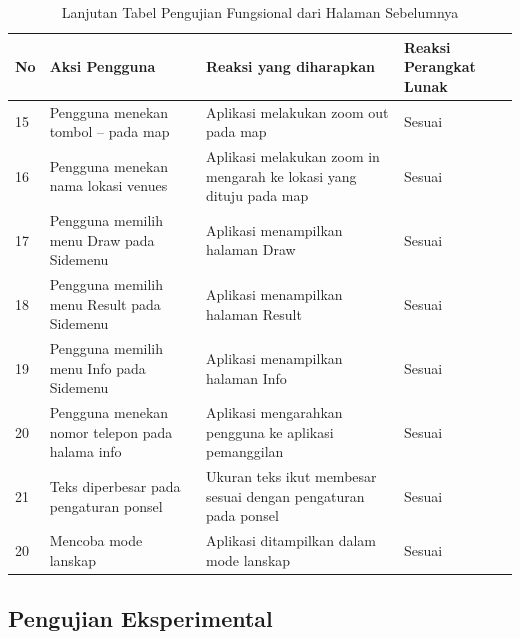 \begin{table}[H]
\caption{Lanjutan Tabel Pengujian Fungsional dari Halaman Sebelumnya}
\label{table:tabelPengujianFungsional}
\begin{tabular}{|p{0.3cm}|p{5.7cm}|p{5.7cm}|p{3cm}|}
\hline
No & Aksi Pengguna                                                                      & Reaksi yang diharapkan                                                               & Reaksi Perangkat Lunak \\ \hline
15 & Pengguna menekan tombol – pada map                                                 & Aplikasi melakukan zoom out pada map                                                 & Sesuai                 \\ \hline
16 & Pengguna menekan nama lokasi venues                                                & Aplikasi melakukan zoom in mengarah ke lokasi yang dituju pada map                   & Sesuai                 \\ \hline
17 & Pengguna memilih menu Draw pada Sidemenu                                            & Aplikasi menampilkan halaman Draw                                                    & Sesuai                 \\ \hline
18 & Pengguna memilih menu Result pada Sidemenu                                          & Aplikasi menampilkan halaman Result                                                  & Sesuai                 \\ \hline
19 & Pengguna memilih menu Info pada Sidemenu                                            & Aplikasi menampilkan halaman Info                                                    & Sesuai                 \\ \hline
20 & Pengguna menekan nomor telepon pada halama info                                    & Aplikasi mengarahkan pengguna ke aplikasi pemanggilan                                & Sesuai                 \\ \hline
21 & Teks diperbesar pada pengaturan ponsel         & Ukuran teks ikut membesar sesuai dengan pengaturan pada ponsel & Sesuai                 \\ \hline
20 & Mencoba mode lanskap                           & Aplikasi ditampilkan dalam mode lanskap & Sesuai                 \\ \hline
\end{tabular}
\end{table}
\subsection{Pengujian Eksperimental}
\label{subsec:pengujianEksperimental}

